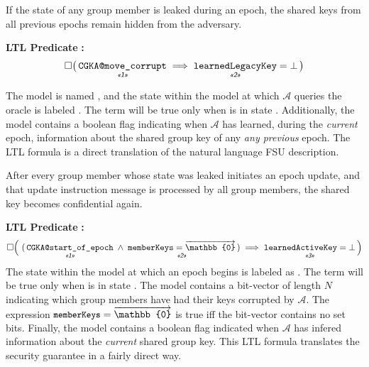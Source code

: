 \documentclass[runningheads]{llncs}
\newcommand{\Abrev}[1]{\gls{#1}}
\newcommand{\Zed}{\ensuremath{\mathbb{0}}\xspace}
\newcommand{\Adversary}{\ensuremath{\mathcal{A}}\xspace}
\begin{document}
\begin{definition}
If the state of any group member is leaked during an epoch, the shared keys from all previous epochs remain hidden from the adversary.
\end{definition}%
\noindent\textbf{LTL Predicate} \textbf{:}%
{\small%
\[%
\Box \big(\, \underset{\UnderNote{1}}{\texttt{CGKA@move\_corrupt}} \implies \underset{\UnderNote{2}}{\texttt{learnedLegacyKey}} = \bot \,\big)%
\]%
}

The \Promela model is named , and the state within the model at which \Adversary queries the oracle   is labeled .
The term  will be true only when  is in state .
Additionally, the model contains a boolean flag  indicating when \Adversary has learned, during the \emph{current} epoch, information about the shared group key of any \emph{any previous} epoch.
The \Abrev{LTL} formula  is a direct translation of the natural language \Abrev{FSU} description.



\begin{definition}
After every group member whose state was leaked initiates an epoch update, and that update instruction message is processed by all group members, the shared key becomes confidential again.
\end{definition}%
\noindent\textbf{LTL Predicate} \textbf{:}%
{\small%
\begin{align*}
\Box \Big(~(\, \underset{\UnderNote{1}}{\texttt{CGKA@start\_of\_epoch}}\;\land\;\underset{\UnderNote{2}}{\texttt{memberKeys} = \overrightarrow{\Zed}} \,) \implies \underset{\UnderNote{3}}{\texttt{learnedActiveKey} = \bot} \, \Big)
\end{align*}
}
The state within the model at which an epoch begins is labeled as .
The term  will be true only when  is in state .
The model contains a bit-vector  of length \(N\) indicating which group members have had their keys corrupted by \Adversary.
The expression \(\TermLTL{memberKeys} = \overrightarrow{\Zed}  \) is true iff the bit-vector contains no set bits.
Finally, the model contains a boolean flag  indicated when \Adversary has infered information about the \emph{current} shared group key.
This  \Abrev{LTL} formula  translates the security guarantee in a fairly direct way.
\end{document}
